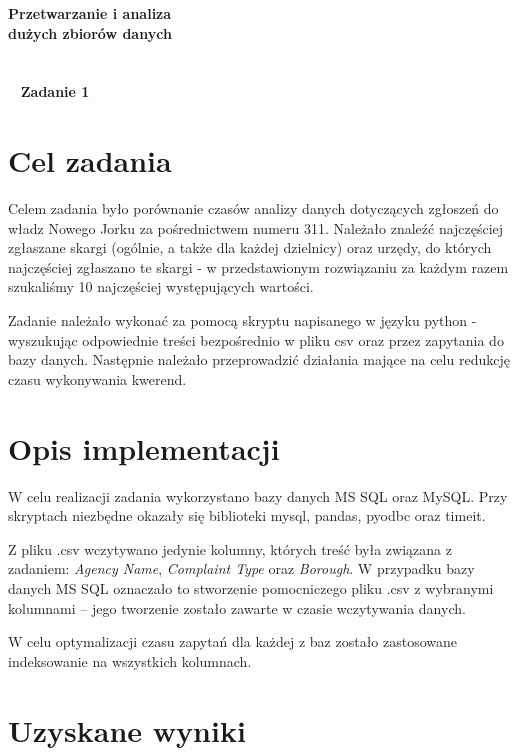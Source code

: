 \documentclass[a4paper,11pt]{article}
\begin{document}
\begin{titlepage}
\begin{center}
\textbf{\Huge{Przetwarzanie i analiza\\}}
\textbf{\Huge{dużych zbiorów danych\\~\\~\\~}}
\textbf{\Huge{Zadanie 1}}
\end{center}

\end{titlepage}

\setcounter{page}{2}

\tableofcontents

\newpage
\section{Cel zadania}

Celem zadania było porównanie czasów analizy danych dotyczących zgłoszeń do władz Nowego Jorku za pośrednictwem numeru 311. Należało znaleźć najczęściej zgłaszane skargi (ogólnie, a także dla każdej dzielnicy) oraz urzędy, do których najczęściej zgłaszano te skargi - w przedstawionym rozwiązaniu za każdym razem szukaliśmy 10 najczęściej występujących wartości.

Zadanie należało wykonać za pomocą skryptu napisanego w języku python - wyszukując odpowiednie treści bezpośrednio w pliku csv oraz przez zapytania do bazy danych. Następnie należało przeprowadzić działania mające na celu redukcję czasu wykonywania kwerend.

\section{Opis implementacji}

W celu realizacji zadania wykorzystano bazy danych MS SQL oraz MySQL. Przy skryptach niezbędne okazały się biblioteki mysql, pandas, pyodbc oraz timeit.

Z pliku .csv wczytywano jedynie kolumny, których treść była związana z zadaniem: \textit{Agency Name}, \textit{Complaint Type} oraz \textit{Borough}. W przypadku bazy danych MS SQL oznaczało to stworzenie pomocniczego pliku .csv z wybranymi kolumnami -- jego tworzenie zostało zawarte w czasie wczytywania danych.

W celu optymalizacji czasu zapytań dla każdej z baz zostało zastosowane indeksowanie na wszystkich kolumnach.

\section{Uzyskane wyniki}
\end{document}
